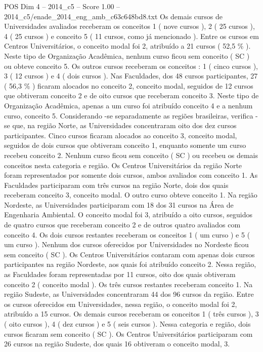 \begin{textsample}{POS Dim 4 – 2014\_c5 – Score 1.00 – 2014\_c5/enade\_2014\_eng\_amb\_c63c648bd8.txt}
Os demais cursos de Universidades avaliados receberam os conceitos 1 ( nove cursos ), 2 ( 25 cursos ), 4 ( 25 cursos ) e conceito 5 ( 11 cursos, como já mencionado ).
Entre os cursos em Centros Universitários, o conceito modal foi 2, atribuído a 21 cursos ( 52,5 \% ).
Neste tipo de Organização Acadêmica, nenhum curso ficou sem conceito ( SC ) ou obteve conceito 5.
Os outros cursos receberam os conceitos : 1 ( cinco cursos ), 3 ( 12 cursos ) e 4 ( dois cursos ).
Nas Faculdades, dos 48 cursos participantes, 27 ( 56,3 \% ) ficaram alocados no conceito 2, conceito modal, seguidos de 12 cursos que obtiveram conceito 2 e de oito cursos que receberam conceito 3.
Neste tipo de Organização Acadêmica, apenas a um curso foi atribuído conceito 4 e a nenhum curso, conceito 5.
Considerando -se separadamente as regiões brasileiras, verifica -se que, na região Norte, as Universidades concentraram oito dos dez cursos participantes.
Cinco cursos ficaram alocados ao conceito 3, conceito modal, seguidos de dois cursos que obtiveram conceito 1, enquanto somente um curso recebeu conceito 2.
Nenhum curso ficou sem conceito ( SC ) ou recebeu os demais conceitos nesta categoria e região.
Os Centros Universitários da região Norte foram representados por somente dois cursos, ambos avaliados com conceito 1.
As Faculdades participaram com três cursos na região Norte, dois dos quais receberam conceito 3, conceito modal.
O outro curso obteve conceito 1.
Na região Nordeste, as Universidades participaram com 18 dos 31 cursos na Área de Engenharia Ambiental.
O conceito modal foi 3, atribuído a oito cursos, seguidos de quatro cursos que receberam conceito 2 e de outros quatro avaliados com conceito 4.
Os dois cursos restantes receberam os conceitos 1 ( um curso ) e 5 ( um curso ).
Nenhum dos cursos oferecidos por Universidades no Nordeste ficou sem conceito ( SC ).
Os Centros Universitários contaram com apenas dois cursos participantes na região Nordeste, aos quais foi atribuído conceito 2.
Nessa região, as Faculdades foram representadas por 11 cursos, oito dos quais obtiveram conceito 2 ( conceito modal ).
Os três cursos restantes receberam conceito 1.
Na região Sudeste, as Universidades concentraram 44 dos 96 cursos da região.
Entre os cursos oferecidos em Universidades, nessa região, o conceito modal foi 2, atribuído a 15 cursos.
Os demais cursos receberam os conceitos 1 ( três cursos ), 3 ( oito cursos ), 4 ( dez cursos ) e 5 ( seis cursos ).
Nessa categoria e região, dois cursos ficaram sem conceito ( SC ).
Os Centros Universitários participaram com 26 cursos na região Sudeste, dos quais 16 obtiveram o conceito modal, 3.

\end{textsample}
